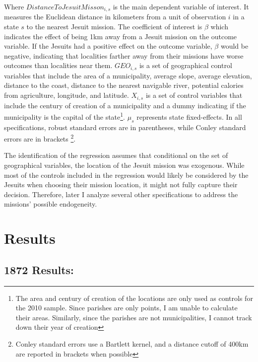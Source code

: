 \documentclass{article}
\begin{document}
Where $DistanceToJesuitMisson_{i,s}$ is the main dependent variable of interest. It measures the Euclidean distance in kilometers from a unit of observation $i$ in a state $s$ to the nearest Jesuit mission. The coefficient of interest is $\beta$ which indicates the effect of being 1km away from a Jesuit mission on the outcome variable. If the Jesuits had a positive effect on the outcome variable,  $\beta$ would be negative, indicating that localities farther away from their missions have worse outcomes than localities near them. $GEO_{i,s}$ is a set of geographical control variables that include the area of a municipality, average slope, average elevation, distance to the coast, distance to the nearest navigable river, potential calories from agriculture, longitude, and latitude. $X_{i,s}$ is a set of control variables that include the century of creation of a municipality and a dummy indicating if the municipality is the capital of the state\footnote{
  The area and century of creation of the locations are only used as controls for the 2010 sample. Since parishes are only points, I am unable to calculate their areas. Similarly, since the parishes are not municipalities, I cannot track down their year of creation}. 
$\mu_s$ represents state fixed-effects. In all specifications, robust standard errors are in parentheses, while Conley standard errors are in brackets \parencite{Conley1999-gq}\footnote{
  Conley standard errors use a Bartlett kernel, and a distance cutoff of 400km are reported in brackets when possible}.

The identification of the regression assumes that conditional on the set of geographical variables, the location of the Jesuit mission was exogenous. While most of the controls included in the regression would likely be considered by the Jesuits when choosing their mission location, it might not fully capture their decision. Therefore, later I analyze several other specifications to address the missions' possible endogeneity. 


\section{Results}

\subsection{1872 Results:}
\end{document}
